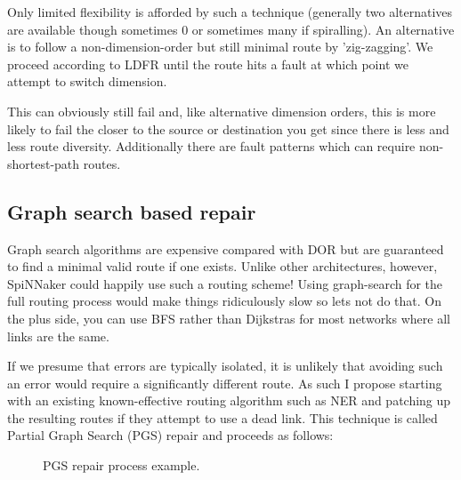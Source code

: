 			Only limited flexibility is afforded by such a technique (generally two
			alternatives are available though sometimes 0 or sometimes many if
			spiralling). An alternative is to follow a non-dimension-order but still
			minimal route by 'zig-zagging'. We proceed according to LDFR until the
			route hits a fault at which point we attempt to switch dimension.
			
			This can obviously still fail and, like alternative dimension orders,
			this is more likely to fail the closer to the source or destination you
			get since there is less and less route diversity. Additionally there are
			fault patterns which can require non-shortest-path routes.
		
		\subsection{Graph search based repair}
			
			Graph search algorithms are expensive compared with DOR but are
			guaranteed to find a minimal valid route if one exists. Unlike other
			architectures, however, SpiNNaker could happily use such a routing
			scheme! Using graph-search for the full routing process would make things
			ridiculously slow so lets not do that. On the plus side, you can use BFS
			rather than Dijkstras for most networks where all links are the same.
			
			If we presume that errors are typically isolated, it is unlikely that
			avoiding such an error would require a significantly different route. As
			such I propose starting with an existing known-effective routing
			algorithm such as NER and patching up the resulting routes if they
			attempt to use a dead link. This technique is called Partial Graph Search
			(PGS) repair and proceeds as follows:
			
			\begin{figure}
				\center
				\begin{subfigure}{0.32\linewidth}
					\hspace*{-1.5em}
					
					\caption{}
					\label{fig:pgs-repair-colouring}
				\end{subfigure}
				\begin{subfigure}{0.32\linewidth}
					\hspace*{-1.5em}
					
					\caption{}
					\label{fig:pgs-repair-colouring-fix1}
				\end{subfigure}
				\begin{subfigure}{0.32\linewidth}
					\hspace*{-1.5em}
					
					\caption{}
					\label{fig:pgs-repair-colouring-fix2}
				\end{subfigure}
				
				\caption{PGS repair process example.}
				\label{fig:pgs-repair-colouring-steps}
			\end{figure}
			
